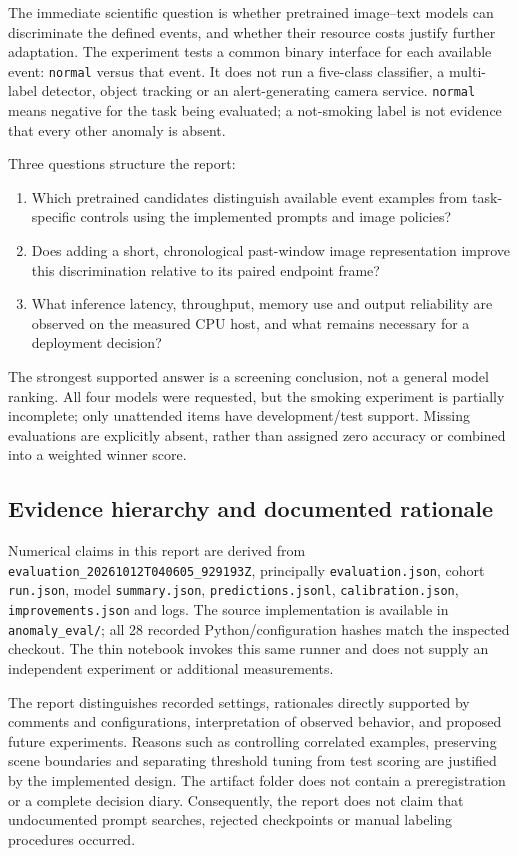 \documentclass[11pt,a4paper]{article}
\newcommand{\code}[1]{\nolinkurl{#1}}
\newcommand{\runid}{\code{evaluation_20261012T040605_929193Z}}
\begin{document}
The immediate scientific question is whether pretrained image--text models can discriminate the defined events, and whether their resource costs justify further adaptation. The experiment tests a common binary interface for each available event: \code{normal} versus that event. It does not run a five-class classifier, a multi-label detector, object tracking or an alert-generating camera service. \code{normal} means negative for the task being evaluated; a not-smoking label is not evidence that every other anomaly is absent.

Three questions structure the report:
\begin{enumerate}
\item Which pretrained candidates distinguish available event examples from task-specific controls using the implemented prompts and image policies?
\item Does adding a short, chronological past-window image representation improve this discrimination relative to its paired endpoint frame?
\item What inference latency, throughput, memory use and output reliability are observed on the measured CPU host, and what remains necessary for a deployment decision?
\end{enumerate}
The strongest supported answer is a screening conclusion, not a general model ranking. All four models were requested, but the smoking experiment is partially incomplete; only unattended items have development/test support. Missing evaluations are explicitly absent, rather than assigned zero accuracy or combined into a weighted winner score.

\subsection{Evidence hierarchy and documented rationale}
Numerical claims in this report are derived from \runid, principally \code{evaluation.json}, cohort \code{run.json}, model \code{summary.json}, \code{predictions.jsonl}, \code{calibration.json}, \code{improvements.json} and logs. The source implementation is available in \code{anomaly_eval/}; all 28 recorded Python/configuration hashes match the inspected checkout. The thin notebook invokes this same runner and does not supply an independent experiment or additional measurements.

The report distinguishes recorded settings, rationales directly supported by comments and configurations, interpretation of observed behavior, and proposed future experiments. Reasons such as controlling correlated examples, preserving scene boundaries and separating threshold tuning from test scoring are justified by the implemented design. The artifact folder does not contain a preregistration or a complete decision diary. Consequently, the report does not claim that undocumented prompt searches, rejected checkpoints or manual labeling procedures occurred.
\end{document}
